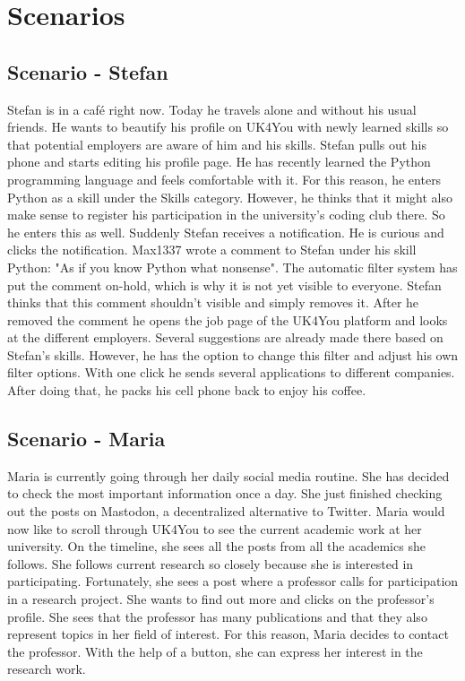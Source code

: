 \section{Scenarios}

\subsection{Scenario - Stefan}
Stefan is in a café right now.
Today he travels alone and without his usual friends.
He wants to beautify his profile on UK4You with newly learned skills so that potential employers are aware of him and his skills.
Stefan pulls out his phone and starts editing his profile page.
He has recently learned the Python programming language and feels comfortable with it.
For this reason, he enters Python as a skill under the Skills category.
However, he thinks that it might also make sense to register his participation in the university's coding club there.
So he enters this as well.
Suddenly Stefan receives a notification.
He is curious and clicks the notification.
Max1337 wrote a comment to Stefan under his skill Python: "As if you know Python what nonsense".
The automatic filter system has put the comment on-hold, which is why it is not yet visible to everyone.
Stefan thinks that this comment shouldn't visible and simply removes it.
After he removed the comment he opens the job page of the UK4You platform and looks at the different employers.
Several suggestions are already made there based on Stefan's skills.
However, he has the option to change this filter and adjust his own filter options.
With one click he sends several applications to different companies.
After doing that, he packs his cell phone back to enjoy his coffee.

\subsection{Scenario - Maria}
Maria is currently going through her daily social media routine.
She has decided to check the most important information once a day.
She just finished checking out the posts on Mastodon, a decentralized alternative to Twitter.
Maria would now like to scroll through UK4You to see the current academic work at her university.
On the timeline, she sees all the posts from all the academics she follows.
She follows current research so closely because she is interested in participating.
Fortunately, she sees a post where a professor calls for participation in a research project.
She wants to find out more and clicks on the professor's profile.
She sees that the professor has many publications and that they also represent topics in her field of interest.
For this reason, Maria decides to contact the professor.
With the help of a button, she can express her interest in the research work.
